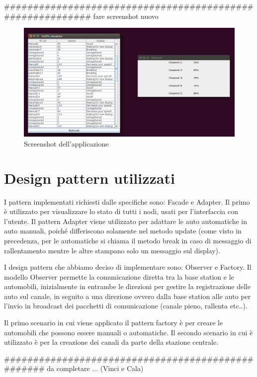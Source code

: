 \documentclass[a4paper,10pt]{article}
\begin{document}
##########################################################  fare screenshot nuovo
\begin{figure}[htbp]
\includegraphics[scale=0.4]{screenshot.png}
\caption{Screenshot dell'applicazione}
\label{class_dig}
\end{figure}

\section{Design pattern utilizzati}
I pattern implementati richiesti dalle specifiche sono: Facade e Adapter. Il primo è utilizzato per visualizzare lo stato di tutti i nodi, usati per l'interfaccia con l'utente. Il pattern Adapter viene utilizzato per adattare le auto automatiche in auto manuali, poiché differiscono solamente nel metodo update (come visto in precedenza, per le automatiche si chiama il metodo break in caso di messaggio di rallentamento mentre le altre stampano solo un messaggio sul display). 

I design pattern che abbiamo deciso di implementare sono: Observer e Factory. Il modello Observer permette la comunicazione diretta tra la base station e le automobili, inizialmente in entrambe le direzioni per gestire la registrazione delle auto sul canale, in seguito a una direzione ovvero dalla base station alle auto per l'invio in broadcast dei pacchetti di comunicazione (canale pieno, rallenta etc..).

Il primo scenario in cui viene applicato il pattern factory è per creare le automobili che possono essere manuali o automatiche. Il secondo scenario in cui è utilizzato è per la creazione dei canali da parte della stazione centrale.

################################################## da completare ... (Vinci e Cala)
\end{document}
